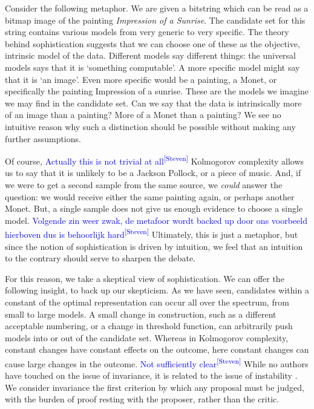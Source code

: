 \documentclass{style/llncs}
\newcommand{\sdr}[1]{\textcolor{blue}{\small #1\textsuperscript{[Steven]} }}
\begin{document}

Consider the following metaphor. We are given a bitstring which can be read as a bitmap image of the painting \emph{Impression of a Sunrise}. The candidate set for this string contains various models from very generic to very specific. The theory behind sophistication suggests that we can choose one of these as the objective, intrinsic model of the data. Different models say different things: the universal models says that it is `something computable'. A more specific model might say that it is `an image'. Even more specific would be a painting, a Monet, or specifically the painting Impression of a sunrise. These are the models we imagine we may find in the candidate set. Can we say that the data is intrinsically more of an image than a painting? More of a Monet than a painting? We see no intuitive reason why such a distinction should be possible without making any further assumptions.

Of course, \sdr{Actually this is not trivial at all} Kolmogorov complexity allows us to say that it is unlikely to be a Jackson Pollock, or a piece of music. And, if we were to get a second sample from the same source, we \emph{could} answer the question: we would receive either the same painting again, or perhaps another Monet. But, a single sample does not give us enough evidence to choose a single model. \sdr{Volgende zin weer zwak, de metafoor wordt backed up door ons voorbeeld hierboven dus is behoorlijk hard} Ultimately, this is just a metaphor, but since the notion of sophistication is driven by intuition, we feel that an intuition to the contrary should serve to sharpen the debate.

For this reason, we take a skeptical view of sophistication. We can offer the following insight, to back up our skepticism. As we have seen, candidates within a constant of the optimal representation can occur all over the spectrum, from small to large models. A small change in construction, such as a different acceptable numbering, or a change in threshold function, can arbitrarily push models into or out of the candidate set. Whereas in Kolmogorov complexity, constant changes have constant effects on the outcome, here constant changes can cause large changes in the outcome. \sdr{Not sufficiently clear} While no authors have touched on the issue of invariance, it is related to the issue of instability \cite{antunes2013sophistication,vereshchagin2013algorithmic}. We consider invariance the first criterion by which any proposal must be judged, with the burden of proof resting with the proposer, rather than the critic.
\end{document}
